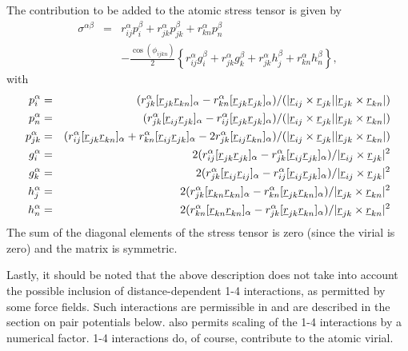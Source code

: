 The contribution to be added to the atomic stress tensor is given by
\begin{eqnarray}
\sigma^{\alpha \beta}&=&r_{ij}^{\alpha}p_{i}^{\beta}+
r_{jk}^{\alpha}p_{jk}^{\beta}+r_{kn}^{\alpha}p_{n}^{\beta} \\ & &
-\frac{\cos(\phi_{ijkn})}{2}\left \{r_{ij}^{\alpha}g_{i}^{\beta}+
r_{jk}^{\alpha}g_{k}^{\beta}+r_{jk}^{\alpha}h_{j}^{\beta}+r_{kn}^{\alpha}h_{n}^{\beta}\right\}
,\nonumber
\end{eqnarray}
with
\begin{eqnarray}
p_{i}^{\alpha}&=&(r_{jk}^{\alpha}[\mbox{$\underline{r}$}_{jk}\mbox{$\underline{r}$}_{kn}]_{\alpha}-
r_{kn}^{\alpha}[\mbox{$\underline{r}$}_{jk}\mbox{$\underline{r}$}_{jk}]_{\alpha})/
(|\mbox{$\underline{r}$}_{ij}\times\mbox{$\underline{r}$}_{jk}||\mbox{$\underline{r}$}_{jk}\times\mbox{$\underline{r}$}_{kn}|)\\
p_{n}^{\alpha}&=&(r_{jk}^{\alpha}[\mbox{$\underline{r}$}_{ij}\mbox{$\underline{r}$}_{jk}]_{\alpha}-
r_{ij}^{\alpha}[\mbox{$\underline{r}$}_{jk}\mbox{$\underline{r}$}_{jk}]_{\alpha})/
(|\mbox{$\underline{r}$}_{ij}\times\mbox{$\underline{r}$}_{jk}||\mbox{$\underline{r}$}_{jk}\times\mbox{$\underline{r}$}_{kn}|)\\
p_{jk}^{\alpha}&=&(r_{ij}^{\alpha}[\mbox{$\underline{r}$}_{jk}\mbox{$\underline{r}$}_{kn}]_{\alpha}+
r_{kn}^{\alpha}[\mbox{$\underline{r}$}_{ij}\mbox{$\underline{r}$}_{jk}]_{\alpha}-
2r_{jk}^{\alpha}[\mbox{$\underline{r}$}_{ij}\mbox{$\underline{r}$}_{kn}]_{\alpha})/
(|\mbox{$\underline{r}$}_{ij}\times\mbox{$\underline{r}$}_{jk}||\mbox{$\underline{r}$}_{jk}\times\mbox{$\underline{r}$}_{kn}|)\\
g_{i}^{\alpha}&=&2(r_{ij}^{\alpha}[\mbox{$\underline{r}$}_{jk}\mbox{$\underline{r}$}_{jk}]_{\alpha}-
r_{jk}^{\alpha}[\mbox{$\underline{r}$}_{ij}\mbox{$\underline{r}$}_{jk}]_{\alpha})/
|\mbox{$\underline{r}$}_{ij}\times\mbox{$\underline{r}$}_{jk}|^{2}\\
g_{k}^{\alpha}&=&2(r_{jk}^{\alpha}[\mbox{$\underline{r}$}_{ij}\mbox{$\underline{r}$}_{ij}]_{\alpha}-
r_{ij}^{\alpha}[\mbox{$\underline{r}$}_{ij}\mbox{$\underline{r}$}_{jk}]_{\alpha})/
|\mbox{$\underline{r}$}_{ij}\times\mbox{$\underline{r}$}_{jk}|^{2}\\
h_{j}^{\alpha}&=&2(r_{jk}^{\alpha}[\mbox{$\underline{r}$}_{kn}\mbox{$\underline{r}$}_{kn}]_{\alpha}-
r_{kn}^{\alpha}[\mbox{$\underline{r}$}_{jk}\mbox{$\underline{r}$}_{kn}]_{\alpha})/
|\mbox{$\underline{r}$}_{jk}\times\mbox{$\underline{r}$}_{kn}|^{2}\\
h_{n}^{\alpha}&=&2(r_{kn}^{\alpha}[\mbox{$\underline{r}$}_{kn}\mbox{$\underline{r}$}_{kn}]_{\alpha}-
r_{jk}^{\alpha}[\mbox{$\underline{r}$}_{jk}\mbox{$\underline{r}$}_{kn}]_{\alpha})/
|\mbox{$\underline{r}$}_{jk}\times\mbox{$\underline{r}$}_{kn}|^{2}
\end{eqnarray}
The sum of the diagonal elements of the stress tensor is zero (since
the virial is zero) and the matrix is symmetric.

Lastly, it should be noted that the above description does not take
into account the possible inclusion of distance-dependent 1-4
interactions, as permitted by some force fields. Such interactions are
permissible in \D{} and are described in the section on pair
potentials below. \D{} also permits scaling of the 1-4
interactions by a numerical factor. 1-4 interactions do, of
course, contribute to the atomic virial.

